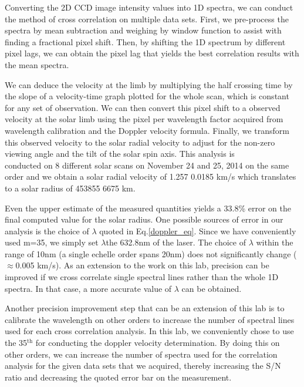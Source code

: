 \documentclass[authoryear, 12pt,5p, times]{elsarticle}
\newcommand{\rpm}{\raisebox{.3ex}{$\scriptstyle\pm$}}
\begin{document}
Converting the 2D CCD image intensity values into 1D spectra, we can conduct the method of cross correlation on multiple data sets. First, we pre-process the spectra by mean subtraction and weighing by window function to assist with finding a fractional pixel shift. Then, by shifting the 1D spectrum by different pixel lags, we can obtain the pixel lag that yields the best correlation results with the mean spectra.

We can deduce the velocity at the limb by multiplying the half crossing time by the slope of a velocity-time graph plotted for the whole scan, which is constant for any set of observation. We can then convert this pixel shift to a observed velocity  at the solar limb using the pixel per wavelength factor acquired  from wavelength calibration and the Doppler velocity formula. Finally, we transform this observed velocity to the solar radial velocity to adjust for the non-zero viewing angle and the tilt of the solar spin axis. This analysis is \\conducted on 8 different solar scans on November 24 and 25, 2014 on the same order and we obtain a solar radial velocity of 1.257 \rpm 0.0185 km/s  which translates to a solar radius of 453855 \rpm 6675 km.

Even the upper estimate of the measured quantities yields a 33.8\% error on the final computed value for the solar radius. One possible sources of error in our analysis is the choice of  $\lambda$ quoted in Eq.\ref{doppler_eq}. Since we have conveniently used m=35, we simply set $\lambda$the 632.8nm of the laser. The choice of $\lambda$ within the range of \rpm 10nm (a single echelle order spans 20nm) does not significantly change ($\approx$\rpm 0.005 km/s). As an extension to the work on this lab, precision can be improved if we cross correlate single spectral lines rather than the whole 1D spectra. In that case, a more accurate value of $\lambda$ can be obtained.

  Another precision improvement step that can be an extension of this lab is to calibrate the wavelength on other orders to increase the number of spectral lines used for each cross correlation analysis. In this lab, we conveniently chose to use the 35$^\text{th}$ for conducting the doppler velocity determination. By doing this on other orders, we can increase the number of spectra used for the correlation analysis for the given data sets that we acquired, thereby increasing the S/N ratio and decreasing the quoted error bar on the measurement.  
\end{document}

